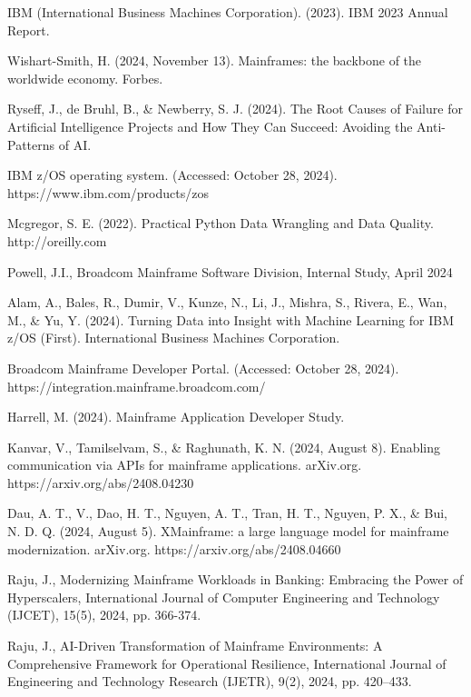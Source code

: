 \documentclass[a4paper]{article}
\begin{document}
\begin{thebibliography}{11}
    \bibitem[1]{}
    IBM (International Business Machines Corporation). (2023). IBM 2023 Annual Report.
    
    \bibitem[2]{}
    Wishart-Smith, H. (2024, November 13). Mainframes: the backbone of the worldwide economy. Forbes.
    
    \bibitem[3]{}
    Ryseff, J., de Bruhl, B., \& Newberry, S. J. (2024). The Root Causes of Failure for Artificial Intelligence Projects and How They Can Succeed: Avoiding the Anti-Patterns of AI.
    
    \bibitem[4]{}
    IBM z/OS operating system. (Accessed: October 28, 2024). https://www.ibm.com/products/zos 
    
    \bibitem[5]{}
    Mcgregor, S. E. (2022). Practical Python Data Wrangling and Data Quality. http://oreilly.com
    
    \bibitem[6]{}
    Powell, J.I., Broadcom Mainframe Software Division, Internal Study, April 2024
    
    \bibitem[7]{}
    Alam, A., Bales, R., Dumir, V., Kunze, N., Li, J., Mishra, S., Rivera, E., Wan, M., \& Yu, Y. (2024). Turning Data into Insight with Machine Learning for IBM z/OS (First). International Business Machines Corporation.
    
    \bibitem[8]{}
    Broadcom Mainframe Developer Portal. (Accessed: October 28, 2024). https://integration.mainframe.broadcom.com/
    
    \bibitem[9]{}
    Harrell, M. (2024). Mainframe Application Developer Study.
    
    \bibitem[10]{}
    Kanvar, V., Tamilselvam, S., \& Raghunath, K. N. (2024, August 8). Enabling communication via APIs for mainframe applications. arXiv.org. https://arxiv.org/abs/2408.04230
    
    \bibitem[11]{}
    Dau, A. T., V., Dao, H. T., Nguyen, A. T., Tran, H. T., Nguyen, P. X., \& Bui, N. D. Q. (2024, August 5). XMainframe: a large language model for mainframe modernization. arXiv.org. https://arxiv.org/abs/2408.04660
    
    \bibitem[12]{}
    Raju, J., Modernizing Mainframe Workloads in Banking: Embracing the Power of Hyperscalers, International Journal of Computer Engineering and Technology (IJCET), 15(5), 2024, pp. 366-374.
    
    \bibitem[13]{}
    Raju, J., AI-Driven Transformation of Mainframe Environments: A Comprehensive Framework for Operational Resilience, International Journal of Engineering and Technology Research (IJETR), 9(2), 2024, pp. 420–433.

\end{thebibliography}
\end{document}

